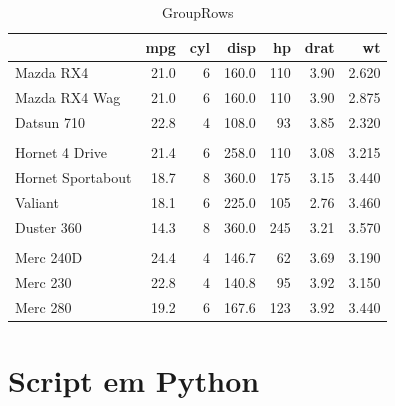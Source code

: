 \documentclass[
	12pt,				%
	openright,			%
	oneside,      %
	a4paper,			%
	english,			%
	french,				%
	spanish,			%
	brazil,				%
	]{abntex2}\usepackage[]{graphicx}\usepackage[]{xcolor}
\newenvironment{knitrout}{}{} %
\begin{document}
\begin{apendicesenv}
\begin{knitrout}
\begin{table}
\caption{\label{tab:script}GroupRows}
\centering
\begin{tabular}[t]{lrrrrrr}
\toprule
  & mpg & cyl & disp & hp & drat & wt\\
\midrule
Mazda RX4 & 21.0 & 6 & 160.0 & 110 & 3.90 & 2.620\\
Mazda RX4 Wag & 21.0 & 6 & 160.0 & 110 & 3.90 & 2.875\\
Datsun 710 & 22.8 & 4 & 108.0 & 93 & 3.85 & 2.320\\
\addlinespace[0.3em]
\multicolumn{7}{l}{\textbf{Group1}}\\
\hspace{1em}Hornet 4 Drive & 21.4 & 6 & 258.0 & 110 & 3.08 & 3.215\\
\hspace{1em}Hornet Sportabout & 18.7 & 8 & 360.0 & 175 & 3.15 & 3.440\\
\hspace{1em}Valiant & 18.1 & 6 & 225.0 & 105 & 2.76 & 3.460\\
\hspace{1em}Duster 360 & 14.3 & 8 & 360.0 & 245 & 3.21 & 3.570\\
\addlinespace[0.3em]
\multicolumn{7}{l}{\textbf{Group2}}\\
\hspace{1em}Merc 240D & 24.4 & 4 & 146.7 & 62 & 3.69 & 3.190\\
\hspace{1em}Merc 230 & 22.8 & 4 & 140.8 & 95 & 3.92 & 3.150\\
\hspace{1em}Merc 280 & 19.2 & 6 & 167.6 & 123 & 3.92 & 3.440\\
\bottomrule
\end{tabular}
\end{table}

\end{knitrout}


\chapter{Script em Python}

\end{apendicesenv}
\end{document}
